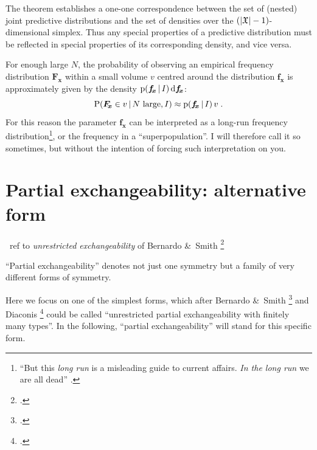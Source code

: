 \documentclass[\ifafour a4paper,12pt,\else a5paper,10pt,\fi%
onecolumn,oneside,article,%
british%
]{memoir}
\theoremstyle{remark}
\theoremstyle{innote}
\newcommand*{\citep}{\footcites}
\newcommand*{\amp}{\&}
\newcommand*{\di}{\mathrm{d}}%
\DeclarePairedDelimiter\abs{\lvert}{\rvert}
\newcommand*{\pf}{\mathrm{p}}%
\newcommand*{\p}{\mathrm{P}}%
\renewcommand*{\|}[1][]{\nonscript\,#1\vert\nonscript\,\mathopen{}}
\newcommand*{\sect}{\S}%
\newcommand*{\puzzle}{{\fontencoding{U}\fontfamily{fontawesometwo}\selectfont\symbol{225}}}
\newcommand{\mynote}[1]{ {\color{notecolour}\puzzle\ #1}}
\renewcommand*{\=}{\TextOrMath\texteq\eq}
\newcommand*{\sx}{\mathfrak{X}}
\newcommand*{\vf}{v}
\newcommand*{\fx}{\bm{f_{\!x}}}
\newcommand*{\Fx}{\bm{F_{\!x}}}
\begin{document}
The theorem establishes a one-one correspondence between the set of
(nested) joint predictive distributions and the set of densities over the
$(\abs{\sx}-1)$-dimensional simplex. Thus any special properties of a
predictive distribution must be reflected in special properties of its
corresponding density, and vice versa.

For enough large $N$, the probability of observing an empirical frequency
distribution $\Fx$ within a small volume $\vf$ centred around the
distribution $\fx$ is approximately given by the density
$\pf(\fx \| I)\,\di\fx$:
\begin{equation}
  \label{eq:longrun_freq}
  \p( \Fx \in v \| \text{$N$ large}, I)
  \approx \pf(\fx \| I)\,v \;.
\end{equation}
For this reason the parameter $\fx$ can be interpreted as a long-run
frequency distribution\footnote{\enquote{But this \emph{long run} is a
    misleading guide to current affairs. \emph{In the long run} we are all
    dead} \parencite[\sect~3.I p.~65]{keynes1923_r2013}.}, or the frequency
in a \enquote{superpopulation}. I will therefore call it so sometimes, but
without the intention of forcing such interpretation on you.


\section{Partial exchangeability: alternative form}
\label{sec:partial_exch}

\mynote{ref to \emph{unrestricted exchangeability} of Bernardo \amp\ Smith
  \citep{bernardoetal1994_r2000,diaconis1988}}

\enquote{Partial exchangeability} denotes not just one symmetry but a
family of very different forms of symmetry.

Here we focus on one of the simplest forms, which after Bernardo \amp\
Smith \citep[\sect~4.6.2 p.~211]{bernardoetal1994_r2000} and Diaconis
\citep[\sect~3 p.~112]{diaconis1988} could be called \enquote{unrestricted
  partial exchangeability with finitely many types}. In the following,
\enquote{partial exchangeability} will stand for this specific form.
\end{document}
